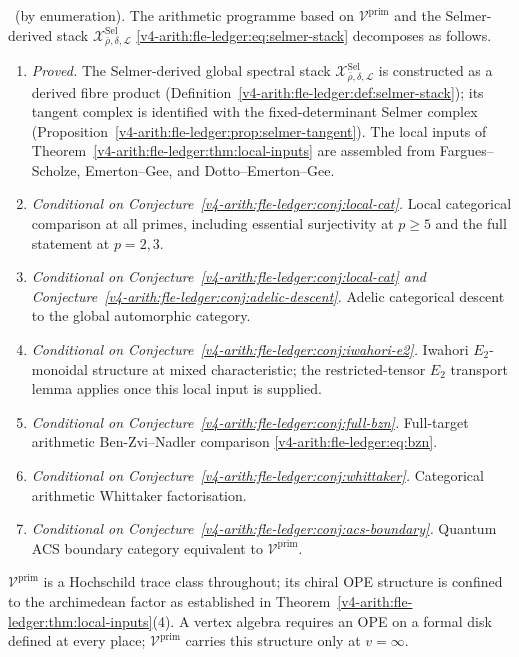 \begin{theorem}
\label{v4-arith:fle-ledger:thm:summary}
\ClaimStatusProvedHere\ (by enumeration).
The arithmetic programme based on
\(\mathcal{V}^{\mathrm{prim}}\) and the Selmer-derived stack
\(\mathcal{X}^{\mathrm{Sel}}_{\bar\rho,\delta,\mathcal{L}}\)
\eqref{v4-arith:fle-ledger:eq:selmer-stack} decomposes as follows.
\begin{enumerate}
\item \emph{Proved.} The Selmer-derived global spectral stack
  \(\mathcal{X}^{\mathrm{Sel}}_{\bar\rho,\delta,\mathcal{L}}\) is
  constructed as a derived fibre product
  (Definition~\ref{v4-arith:fle-ledger:def:selmer-stack}); its tangent
  complex is identified with the fixed-determinant Selmer complex
  (Proposition~\ref{v4-arith:fle-ledger:prop:selmer-tangent}). The
  local inputs of
  Theorem~\ref{v4-arith:fle-ledger:thm:local-inputs} are
  assembled from Fargues--Scholze, Emerton--Gee, and
  Dotto--Emerton--Gee.

\item \emph{Conditional on
  Conjecture~\ref{v4-arith:fle-ledger:conj:local-cat}.}
  Local categorical comparison at all primes, including essential
  surjectivity at \(p \geq 5\) and the full statement at \(p = 2, 3\).

\item \emph{Conditional on
  Conjecture~\ref{v4-arith:fle-ledger:conj:local-cat} and
  Conjecture~\ref{v4-arith:fle-ledger:conj:adelic-descent}.}
  Adelic categorical descent to the global automorphic category.

\item \emph{Conditional on
  Conjecture~\ref{v4-arith:fle-ledger:conj:iwahori-e2}.}
  Iwahori \(E_{2}\)-monoidal structure at mixed characteristic;
  the restricted-tensor \(E_{2}\) transport lemma applies once this
  local input is supplied.

\item \emph{Conditional on
  Conjecture~\ref{v4-arith:fle-ledger:conj:full-bzn}.}
  Full-target arithmetic Ben-Zvi--Nadler comparison
  \eqref{v4-arith:fle-ledger:eq:bzn}.

\item \emph{Conditional on
  Conjecture~\ref{v4-arith:fle-ledger:conj:whittaker}.}
  Categorical arithmetic Whittaker factorisation.

\item \emph{Conditional on
  Conjecture~\ref{v4-arith:fle-ledger:conj:acs-boundary}.}
  Quantum ACS boundary category equivalent to
  \(\mathcal{V}^{\mathrm{prim}}\).
\end{enumerate}
\(\mathcal{V}^{\mathrm{prim}}\) is a Hochschild trace class throughout;
its chiral OPE structure is confined to the archimedean factor
as established in Theorem~\ref{v4-arith:fle-ledger:thm:local-inputs}(4).
A vertex algebra requires an OPE on a formal disk defined at every
place; \(\mathcal{V}^{\mathrm{prim}}\) carries this structure only at
\(v = \infty\).
\end{theorem}
